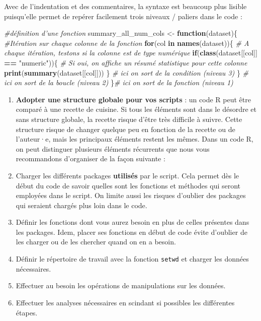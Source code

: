 \documentclass[
  11pt,
  french,
]{book}
\makeatletter
\newenvironment{Shaded}{\begin{snugshade}}{\end{snugshade}}
\newcommand{\CommentTok}[1]{\textcolor[rgb]{0.56,0.35,0.01}{\textit{#1}}}
\newcommand{\ControlFlowTok}[1]{\textcolor[rgb]{0.13,0.29,0.53}{\textbf{#1}}}
\newcommand{\KeywordTok}[1]{\textcolor[rgb]{0.13,0.29,0.53}{\textbf{#1}}}
\newcommand{\NormalTok}[1]{#1}
\newcommand{\OperatorTok}[1]{\textcolor[rgb]{0.81,0.36,0.00}{\textbf{#1}}}
\newcommand{\StringTok}[1]{\textcolor[rgb]{0.31,0.60,0.02}{#1}}
\providecommand{\tightlist}{%
  \setlength{\itemsep}{0pt}\setlength{\parskip}{0pt}}
\newenvironment{kframe}{%
\medskip{}
\setlength{\fboxsep}{.8em}
 \def\at@end@of@kframe{}%
 \ifinner\ifhmode%
  \def\at@end@of@kframe{\end{minipage}}%
  \begin{minipage}{\columnwidth}%
 \fi\fi%
 \def\FrameCommand##1{\hskip\@totalleftmargin \hskip-\fboxsep
 \colorbox{shadecolor}{##1}\hskip-\fboxsep
     \hskip-\linewidth \hskip-\@totalleftmargin \hskip\columnwidth}%
 \MakeFramed {\advance\hsize-\width
   \@totalleftmargin\z@ \linewidth\hsize
   \@setminipage}}%
 {\par\unskip\endMakeFramed%
 \at@end@of@kframe}
\renewenvironment{Shaded}{\begin{kframe}}{\end{kframe}}
\makeatother
\begin{document}
Avec de l'indentation et des commentaires, la syntaxe est beaucoup plus lisible puisqu'elle permet de repérer facilement trois niveaux / paliers dans le code :

\begin{Shaded}
\begin{Highlighting}[]
\CommentTok{#définition d'une fonction}
\NormalTok{summary_all_num_cols <-}\StringTok{ }\ControlFlowTok{function}\NormalTok{(dataset)\{}
  \CommentTok{#Itération sur chaque colonne de la fonction}
  \ControlFlowTok{for}\NormalTok{(col }\ControlFlowTok{in} \KeywordTok{names}\NormalTok{(dataset))\{}
    \CommentTok{# A chaque itération, testons si la colonne est de type numérique}
    \ControlFlowTok{if}\NormalTok{(}\KeywordTok{class}\NormalTok{(dataset[[col]] }\OperatorTok{==}\StringTok{ "numeric"}\NormalTok{))\{}
      \CommentTok{# Si oui, on affiche un résumé statistique pour cette colonne}
      \KeywordTok{print}\NormalTok{(}\KeywordTok{summary}\NormalTok{(dataset[[col]]))}
\NormalTok{    \} }\CommentTok{# ici on sort de la condition (niveau 3)}
\NormalTok{  \} }\CommentTok{# ici on sort de la boucle (niveau 2)}
\NormalTok{\}}\CommentTok{# ici on sort de la fonction (niveau 1)}
\end{Highlighting}
\end{Shaded}

\begin{enumerate}
\def\labelenumi{\arabic{enumi}.}
\setcounter{enumi}{5}
\tightlist
\item
  \textbf{Adopter une structure globale pour vos scripts} : un code R peut être comparé à une recette de cuisine. Si tous les éléments sont dans le désordre et sans structure globale, la recette risque d'être très difficile à suivre. Cette structure risque de changer quelque peu en fonction de la recette ou de l'auteur·e, mais les principaux éléments restent les mêmes. Dans un code R, on peut distinguer plusieurs éléments récurrents que nous vous recommandons d'organiser de la façon suivante :
\item
  Charger les différents packages \textbf{utilisés} par le script. Cela permet dès le début du code de savoir quelles sont les fonctions et méthodes qui seront employées dans le script. On limite aussi les risques d'oublier des packages qui seraient chargés plus loin dans le code.
\item
  Définir les fonctions dont vous aurez besoin en plus de celles présentes dans les packages. Idem, placer ses fonctions en début de code évite d'oublier de les charger ou de les chercher quand on en a besoin.
\item
  Définir le répertoire de travail avec la fonction \texttt{setwd} et charger les données nécessaires.
\item
  Effectuer au besoin les opérations de manipulations sur les données.
\item
  Effectuer les analyses nécessaires en scindant si possibles les différentes étapes.
\end{enumerate}
\end{document}

